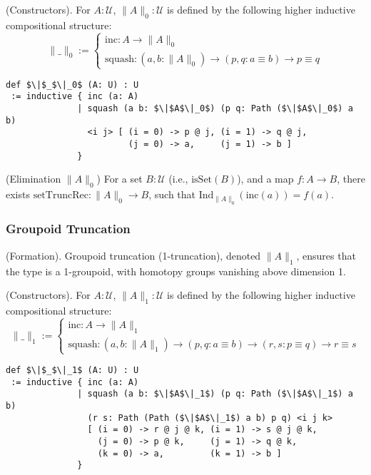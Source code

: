\documentclass{article}
\begin{document}
\begin{definition} (Constructors).
For \( A : \mathcal{U} \), \( \| A \|_0 : \mathcal{U} \) is defined by the following higher
inductive compositional structure:
\[
\| \_ \|_0 :=
\begin{cases}
\text{inc} : A \to \| A \|_0 \\
\text{squash} : (a, b : \| A \|_0) \to (p, q : a \equiv b) \to p \equiv q
\end{cases}
\]
\begin{lstlisting}[mathescape=true]
def $\|$_$\|_0$ (A: U) : U
 := inductive { inc (a: A)
              | squash (a b: $\|$A$\|_0$) (p q: Path ($\|$A$\|_0$) a b)
                <i j> [ (i = 0) -> p @ j, (i = 1) -> q @ j,
                        (j = 0) -> a,     (j = 1) -> b ]
              }
\end{lstlisting}
\end{definition}

\begin{theorem} (Elimination \( \| A \|_0 \))
For a set \( B : \mathcal{U} \) (i.e., \( \text{isSet}(B) \)), and a map \( f : A \to B \),
there exists \( \text{setTruncRec} : \| A \|_0 \to B \), such that \( \text{Ind}_{\|A\|_0}(\text{inc}(a)) = f(a) \).
\end{theorem}

\subsubsection*{Groupoid Truncation}
\begin{definition} (Formation).
Groupoid truncation (1-truncation), denoted \( \| A \|_1 \), ensures that
the type is a 1-groupoid, with homotopy groups vanishing above dimension 1.
\end{definition}

\begin{definition} (Constructors).
For \( A : \mathcal{U} \), \( \| A \|_1 : \mathcal{U} \) is defined by the following higher
inductive compositional structure:
\[
\| \_ \|_1 :=
\begin{cases}
\text{inc} : A \to \| A \|_1 \\
\text{squash} : (a, b : \| A \|_1) \to (p, q : a \equiv b) \to (r, s : p \equiv q) \to r \equiv s
\end{cases}
\]
\begin{lstlisting}[mathescape=true]
def $\|$_$\|_1$ (A: U) : U
 := inductive { inc (a: A)
              | squash (a b: $\|$A$\|_1$) (p q: Path ($\|$A$\|_1$) a b)
                (r s: Path (Path ($\|$A$\|_1$) a b) p q) <i j k>
                [ (i = 0) -> r @ j @ k, (i = 1) -> s @ j @ k,
                  (j = 0) -> p @ k,     (j = 1) -> q @ k,
                  (k = 0) -> a,         (k = 1) -> b ]
              }
\end{lstlisting}
\end{definition}
\end{document}
